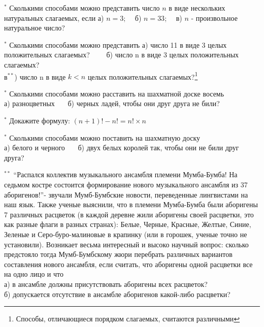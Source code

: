 
\begin{thm}
	$^{\ast}$ Сколькими способами можно представить число $n$ в виде нескольких натуральных слагаемых, если а) $n = 3$;~~ б) $n = 33$;~~ в) $n$ - произвольное натуральное число?
\end{thm}

\begin{thm}
	$^{\ast}$ Сколькими способами можно представить
	а) число 11 в виде 3 целых положительных слагаемых?~~~~
	б) число n в виде 3 целых положительных слагаемых?\\
	в$^{\ast\ast}$) число n в виде  $k < n$  целых положительных слагаемых?\footnote{Способы, отличающиеся порядком слагаемых, считаются различными}
\end{thm}

\begin{thm}
	$^{\ast}$ Сколькими способами можно расставить на шахматной доске восемь\\ а) разноцветных~~~  б) черных ладей, чтобы они друг друга не били?
\end{thm}

\begin{thm}
	$^{\ast}$ Докажите формулу: $(n + 1)! - n! = n!\times n$
\end{thm}

\begin{thm}
	$^{\ast}$ Сколькими способами можно поставить на шахматную доску\\ а) белого и черного~~~ б) двух белых королей так, чтобы они не били друг друга?
\end{thm}

\begin{thm}$^{\ast\ast}$
	\textquotedblleft Распался коллектив музыкального ансамбля племени Мумба-Бумба! На седьмом костре состоится формирование нового музыкального ансамбля из 37 аборигенов!\textquotedblright - звучали Мумб-Бумбские новости, переведенные лингвистами на наш язык. Также ученые выяснили, что в племени Мумба-Бумба были аборигены 7 различных расцветок (в каждой деревне жили аборигены своей расцветки, это как разные флаги в разных странах): Белые, Черные, Красные, Желтые, Синие, Зеленые и Серо-буро-малиновые в крапинку (или в горошек, ученые точно не установили). Возникает весьма интересный и высоко научный вопрос: сколько предстояло тогда Мумб-Бумбскому жюри перебрать различных вариантов составления нового ансамбля, если считать, что аборигены одной расцветки все на одно лицо и что\\
	а) в ансамбле должны присутствовать аборигены всех расцветок?\\
	б) допускается отсутствие в ансамбле аборигенов какой-либо расцветки?
\end{thm}

